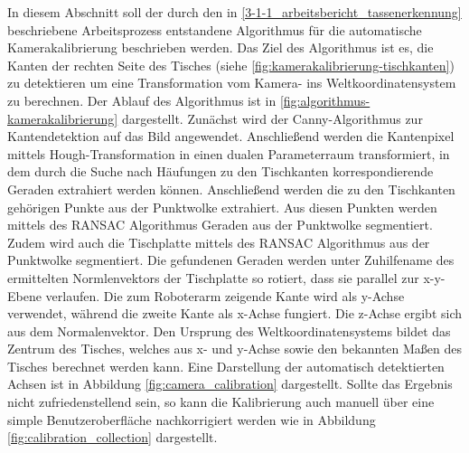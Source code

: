 In diesem Abschnitt soll der durch den in \ref{3-1-1_arbeitsbericht_tassenerkennung} beschriebene Arbeitsprozess entstandene Algorithmus für die automatische Kamerakalibrierung beschrieben werden. Das Ziel des Algorithmus ist es, die Kanten der rechten Seite des Tisches (siehe \ref{fig:kamerakalibrierung-tischkanten}) zu detektieren um eine Transformation vom Kamera- ins Weltkoordinatensystem zu berechnen. Der Ablauf des Algorithmus ist in \ref{fig:algorithmus-kamerakalibrierung} dargestellt. Zunächst wird der Canny-Algorithmus zur Kantendetektion auf das Bild angewendet. Anschließend werden die Kantenpixel mittels Hough-Transformation in einen dualen Parameterraum transformiert, in dem durch die Suche nach Häufungen zu den Tischkanten korrespondierende Geraden extrahiert werden können. Anschließend werden die zu den Tischkanten gehörigen Punkte aus der Punktwolke extrahiert. Aus diesen Punkten werden mittels des RANSAC Algorithmus Geraden aus der Punktwolke segmentiert. Zudem wird auch die Tischplatte mittels des RANSAC Algorithmus aus der Punktwolke segmentiert. Die gefundenen Geraden werden unter Zuhilfename des ermittelten Normlenvektors der Tischplatte so rotiert, dass sie parallel zur x-y-Ebene verlaufen. Die zum Roboterarm zeigende Kante wird als y-Achse verwendet, während die zweite Kante als x-Achse fungiert. Die z-Achse ergibt sich aus dem Normalenvektor. Den Ursprung des Weltkoordinatensystems bildet das Zentrum des Tisches, welches aus x- und y-Achse sowie den bekannten Maßen des Tisches berechnet werden kann. Eine Darstellung der automatisch detektierten Achsen ist in Abbildung \ref{fig:camera_calibration} dargestellt. Sollte das Ergebnis nicht zufriedenstellend sein, so kann die Kalibrierung auch manuell über eine simple Benutzeroberfläche nachkorrigiert werden wie in Abbildung \ref{fig:calibration_collection} dargestellt.
